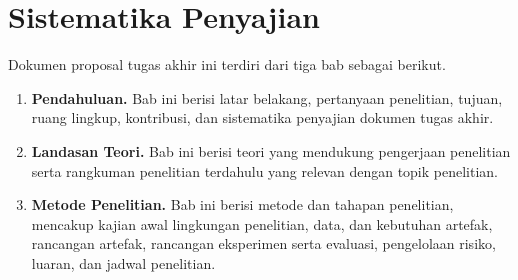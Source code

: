 \section{Sistematika Penyajian}
\label{sec:sistematika}

Dokumen proposal tugas akhir ini terdiri dari tiga bab sebagai berikut.

\begin{enumerate}[label=\textbf{Bab \Roman*}., leftmargin=*]
  \item \textbf{Pendahuluan.} Bab ini berisi latar belakang, pertanyaan penelitian, tujuan, ruang lingkup, kontribusi, dan sistematika penyajian dokumen tugas akhir.
  \item \textbf{Landasan Teori.} Bab ini berisi teori yang mendukung pengerjaan penelitian serta rangkuman penelitian terdahulu yang relevan dengan topik penelitian.
  \item \textbf{Metode Penelitian.} Bab ini berisi metode dan tahapan penelitian, mencakup kajian awal lingkungan penelitian, data, dan kebutuhan artefak, rancangan artefak, rancangan eksperimen serta evaluasi, pengelolaan risiko, luaran, dan jadwal penelitian.
\end{enumerate}